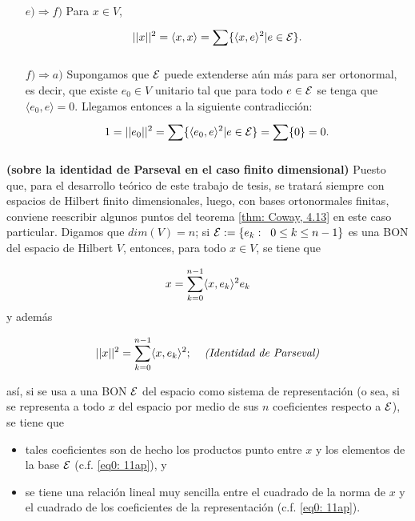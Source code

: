 \begin{itemize}
\item[$e) \Rightarrow f)$] Para $x \in V$,
\[
||x||^{2}=\langle x,x \rangle = \sum\limits_{}^{}\{
\langle x,e\rangle ^{2}| e \in \mathcal{E} \}.
\]

\item[$f) \Rightarrow a)$]
Supongamos que $\mathcal{E}$ puede extenderse aún más
para ser ortonormal, es decir, que existe 
$e_{0} \in V$ unitario tal que
para todo $e \in \mathcal{E}$ se tenga que 
$\langle e_{0}, e \rangle=0$. 
Llegamos entonces a la siguiente contradicción:
\[
1=||e_{0}||^{2}=\sum\limits_{}^{}\{ 
\langle e_{0}, e \rangle^{2}| e \in \mathcal{E} \}=
\sum\limits_{}^{}\{ 0\}=0.
\]
\QEDB
\end{itemize}
\vspace{0.2cm}


\begin{nota}
\label{nota: sobre la identidad de parseval}
\textbf{(sobre la identidad de Parseval en el
caso finito dimensional)}
Puesto que, para el desarrollo teórico de este trabajo de tesis,
se tratará siempre con espacios de Hilbert finito dimensionales, luego, con
bases ortonormales finitas, conviene
reescribir algunos puntos del teorema 
\ref{thm: Coway, 4.13} en este caso particular.
Digamos que $dim(V)=n$; si 
$\mathcal{E} := \{e_{k}: \hspace{0.2cm} 0 \leq k \leq n-1 \}$ es una
BON del espacio de Hilbert $V$, entonces, para todo
$x \in V$, se tiene que 

\begin{equation}
\label{eq0: 11ap}
x = \sum\limits_{k=0}^{n-1}\langle x , e_{k} \rangle^{2} e_{k}
\end{equation}
y además

\begin{equation}
\label{eq1: 11ap}
|| x ||^{2} = \sum\limits_{k=0}^{n-1}\langle x , e_{k} \rangle^{2};
\hspace{0.4cm} \textit{(Identidad de Parseval)}
\end{equation}


\noindent
así, si se usa a una BON $\mathcal{E}$ del espacio como sistema
de representación (o sea, si se representa a todo $x$ del espacio 
por medio de sus $n$ coeficientes respecto a $\mathcal{E}$), se tiene que
\begin{itemize}
	\item tales coeficientes son de hecho los productos punto entre
	$x$ y los elementos de la base $\mathcal{E}$ (c.f. 
	\eqref{eq0: 11ap}), y
	\item se tiene una relación lineal muy sencilla entre el cuadrado
	de la norma de $x$ y el cuadrado de los coeficientes de la representación
	(c.f. \eqref{eq0: 11ap}).
\end{itemize}


\end{nota}
